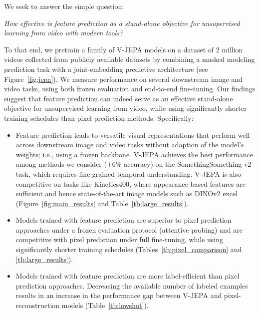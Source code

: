 \documentclass[twocolumn]{fairmeta}
\newcommand{\putalg}{{\small V-JEPA}\xspace}
\theoremstyle{plain}
\theoremstyle{definition}
\theoremstyle{remark}
\begin{document}
We seek to answer the simple question:
\begin{displayquote}\it
    How effective is feature prediction as a stand-alone objective for unsupervised learning from video with modern tools?
\end{displayquote}
To that end, we pretrain a family of \putalg models on a dataset of 2 million videos collected from publicly available datasets by combining a masked modeling prediction task with a joint-embedding predictive architecture (see Figure~\ref{fig:jepa}).
We measure performance on several downstream image and video tasks, using both frozen evaluation and end-to-end fine-tuning.
Our findings suggest that feature prediction can indeed serve as an effective stand-alone objective for unsupervised learning from video, while using significantly shorter training schedules than pixel prediction methods. Specifically:
\begin{itemize}
    \itemsep0em 
    \item Feature prediction leads to versatile visual representations that perform well across downstream image and video tasks without adaption of the model's weights; i.e., using a frozen backbone. \putalg achieves the best performance among methods we consider (+6\% accuracy) on the SomethingSomething-v2 task, which requires fine-grained temporal understanding. \putalg is also competitive on tasks like Kinetics400, where appearance-based features are sufficient and hence state-of-the-art image models such as DINOv2 excel (Figure~\ref{fig:main_results} and Table~\ref{tb:large_results}).
    \item Models trained with feature prediction are superior to pixel prediction approaches under a frozen evaluation protocol (attentive probing) and are competitive with pixel prediction under full fine-tuning, while using significantly shorter training schedules (Tables~\ref{tb:pixel_comparison} and \ref{tb:large_results}).
    \item Models trained with feature prediction are more label-efficient than pixel prediction approaches. Decreasing the available number of labeled examples results in an increase in the performance gap between V-JEPA and pixel-reconstruction models (Table~\ref{tb:lowshot}).
\end{itemize}
\end{document}
